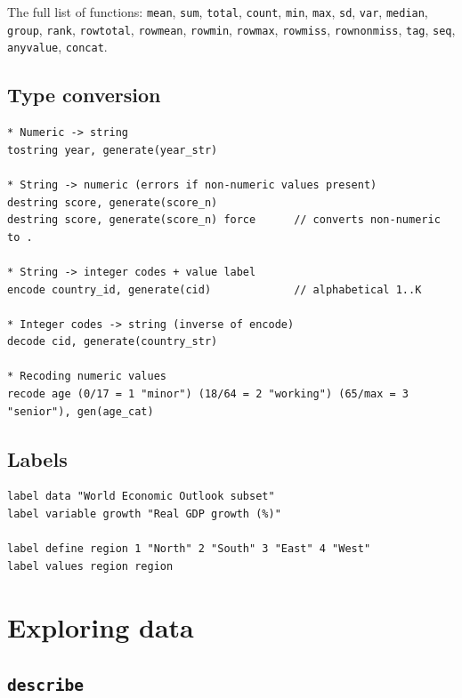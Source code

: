 \documentclass[11pt,letterpaper]{article}
\begin{document}
The full list of functions: \texttt{mean}, \texttt{sum}, \texttt{total},
\texttt{count}, \texttt{min}, \texttt{max}, \texttt{sd}, \texttt{var},
\texttt{median}, \texttt{group}, \texttt{rank}, \texttt{rowtotal},
\texttt{rowmean}, \texttt{rowmin}, \texttt{rowmax}, \texttt{rowmiss},
\texttt{rownonmiss}, \texttt{tag}, \texttt{seq}, \texttt{anyvalue},
\texttt{concat}.

\subsection{Type conversion}

\begin{lstlisting}
* Numeric -> string
tostring year, generate(year_str)

* String -> numeric (errors if non-numeric values present)
destring score, generate(score_n)
destring score, generate(score_n) force      // converts non-numeric to .

* String -> integer codes + value label
encode country_id, generate(cid)             // alphabetical 1..K

* Integer codes -> string (inverse of encode)
decode cid, generate(country_str)

* Recoding numeric values
recode age (0/17 = 1 "minor") (18/64 = 2 "working") (65/max = 3 "senior"), gen(age_cat)
\end{lstlisting}

\subsection{Labels}

\begin{lstlisting}
label data "World Economic Outlook subset"
label variable growth "Real GDP growth (%)"

label define region 1 "North" 2 "South" 3 "East" 4 "West"
label values region region
\end{lstlisting}

\section{Exploring data}

\subsection{\texttt{describe}}
\end{document}
